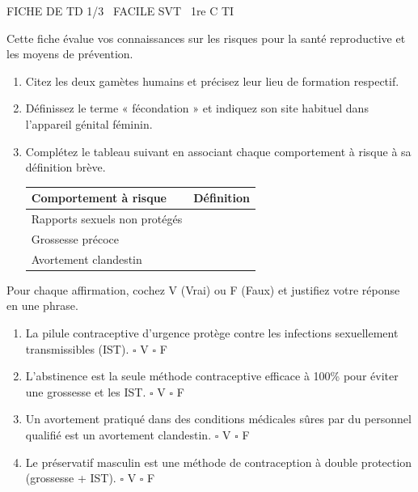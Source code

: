 \documentclass[11pt]{article}
\begin{document}
\begin{tcolorbox}[enhanced,colback=popink,colframe=popink,arc=10pt,boxrule=0pt,left=12pt,right=12pt,top=9pt,bottom=9pt]
{\color{white}\popxbold\small FICHE DE TD 1/3 \textbullet\ FACILE \hfill SVT \textbullet\ 1re C TI\par}
\end{tcolorbox}
\vspace{4pt}
Cette fiche évalue vos connaissances sur les risques pour la santé reproductive et les moyens de prévention.

\begin{exercice}
\begin{enumerate}
    \item Citez les deux gamètes humains et précisez leur lieu de formation respectif.
    \item Définissez le terme « fécondation » et indiquez son site habituel dans l'appareil génital féminin.
    \item Complétez le tableau suivant en associant chaque comportement à risque à sa définition brève.
    
    \begin{tabular}{|p{4cm}|p{10cm}|}
    \hline
    \textbf{Comportement à risque} & \textbf{Définition} \\ \hline
    Rapports sexuels non protégés & \\ \hline
    Grossesse précoce & \\ \hline
    Avortement clandestin & \\ \hline
    \end{tabular}
\end{enumerate}
\end{exercice}

\begin{exercice}
Pour chaque affirmation, cochez V (Vrai) ou F (Faux) et justifiez votre réponse en une phrase.
\begin{enumerate}
    \item La pilule contraceptive d'urgence protège contre les infections sexuellement transmissibles (IST). \hfill $\square$ V \quad $\square$ F
    \item L'abstinence est la seule méthode contraceptive efficace à 100\% pour éviter une grossesse et les IST. \hfill $\square$ V \quad $\square$ F
    \item Un avortement pratiqué dans des conditions médicales sûres par du personnel qualifié est un avortement clandestin. \hfill $\square$ V \quad $\square$ F
    \item Le préservatif masculin est une méthode de contraception à double protection (grossesse + IST). \hfill $\square$ V \quad $\square$ F
\end{enumerate}
\end{exercice}
\end{document}
